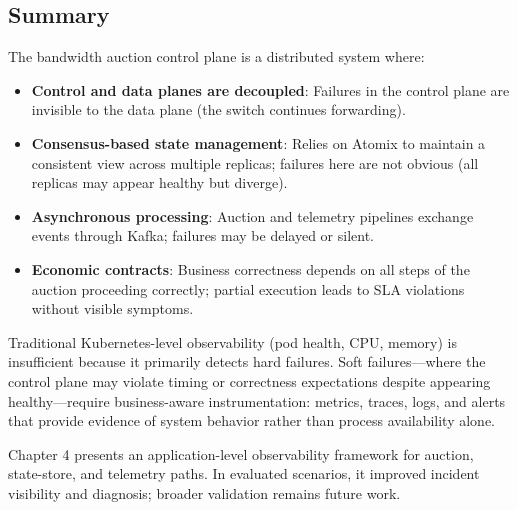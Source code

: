 \subsection*{Summary}

The bandwidth auction control plane is a distributed system where:

\begin{itemize}
    \item \textbf{Control and data planes are decoupled}: Failures in the control plane are invisible to the data plane (the switch continues forwarding).
    \item \textbf{Consensus-based state management}: Relies on Atomix to maintain a consistent view across multiple replicas; failures here are not obvious (all replicas may appear healthy but diverge).
    \item \textbf{Asynchronous processing}: Auction and telemetry pipelines exchange events through Kafka; failures may be delayed or silent.
    \item \textbf{Economic contracts}: Business correctness depends on all steps of the auction proceeding correctly; partial execution leads to SLA violations without visible symptoms.
\end{itemize}

Traditional Kubernetes-level observability (pod health, CPU, memory) is insufficient because it primarily detects hard failures. Soft failures---where the control plane may violate timing or correctness expectations despite appearing healthy---require business-aware instrumentation: metrics, traces, logs, and alerts that provide evidence of system behavior rather than process availability alone.

Chapter 4 presents an application-level observability framework for auction, state-store, and telemetry paths. In evaluated scenarios, it improved incident visibility and diagnosis; broader validation remains future work.
